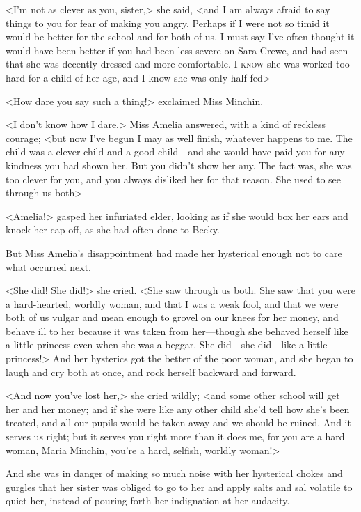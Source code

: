 <I'm not as clever as you, sister,> she said, <and I am always afraid to say things to you for fear of making you angry. Perhaps if I were not so timid it would be better for the school and for both of us. I must say I've often thought it would have been better if you had been less severe on Sara Crewe, and had seen that she was decently dressed and more comfortable. I \textsc{know} she was worked too hard for a child of her age, and I know she was only half fed\longdash>

<How dare you say such a thing!> exclaimed Miss Minchin.

<I don't know how I dare,> Miss Amelia answered, with a kind of reckless courage; <but now I've begun I may as well finish, whatever happens to me. The child was a clever child and a good child—and she would have paid you for any kindness you had shown her. But you didn't show her any. The fact was, she was too clever for you, and you always disliked her for that reason. She used to see through us both\longdash>

<Amelia!> gasped her infuriated elder, looking as if she would box her ears and knock her cap off, as she had often done to Becky.

But Miss Amelia's disappointment had made her hysterical enough not to care what occurred next.

<She did! She did!> she cried. <She saw through us both. She saw that you were a hard-hearted, worldly woman, and that I was a weak fool, and that we were both of us vulgar and mean enough to grovel on our knees for her money, and behave ill to her because it was taken from her—though she behaved herself like a little princess even when she was a beggar. She did—she did—like a little princess!> And her hysterics got the better of the poor woman, and she began to laugh and cry both at once, and rock herself backward and forward.

<And now you've lost her,> she cried wildly; <and some other school will get her and her money; and if she were like any other child she'd tell how she's been treated, and all our pupils would be taken away and we should be ruined. And it serves us right; but it serves you right more than it does me, for you are a hard woman, Maria Minchin, you're a hard, selfish, worldly woman!>

And she was in danger of making so much noise with her hysterical chokes and gurgles that her sister was obliged to go to her and apply salts and sal volatile to quiet her, instead of pouring forth her indignation at her audacity.

